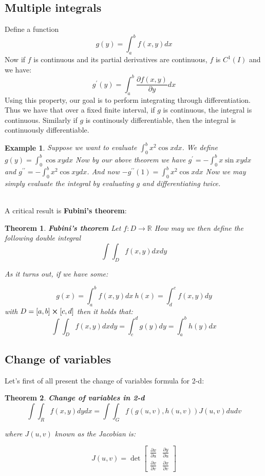 \documentclass[titlepage]{article}
\newtheorem{theorem}{Theorem}[section]
\newtheorem{example}{Example}[section]
\begin{document}
\subsection{Multiple integrals}

Define a function $$g(y) = \int_{a}^{b} f(x,y)dx$$ Now if $f$ is continuous and its partial derivatives are continuous, $f$ is $C^{1}(I)$ and we have:
$$g^{\prime}(y) = \int_{a}^{b} \frac{\partial f(x,y)}{\partial y}dx$$ Using this property, our goal is to perform integrating through differentiation. Thus we have that over a fixed finite interval, if $g$ is continuous, the integral is continuous. Similarly if $g$ is continously differentiable, then the integral is continuously differentiable. 

\begin{example}
Suppose we want to evaluate $\int_{0}^{b}x^{2}\cos{x}dx$. We define $g(y) = \int_{0}^{b}\cos{xy}dx$ Now by our above theorem we have $g^{\prime} = - \int_{0}^{b}x \sin{xy} dx$ and $g^{\prime\prime} = - \int_{0}^{b}x^{2} \cos{xy} dx$. And now $-g^{\prime\prime}(1) = \int_{0}^{b}x^{2} \cos{x} dx $ Now we may simply evaluate the integral by evaluating $g$ and differentiating twice. 
\end{example}
\\

A critical result is \textbf{Fubini's theorem}:

\begin{theorem}\textbf{Fubini's theorem}
Let $f:D \to \mathbb{R}$ How may we then define the following double integral $$\int{\int_{D}f(x,y) dxdy}$$

As it turns out, if we have some:

$$g(x) = \int_{a}^{b} f(x,y) dx \  h(x) = \int_{d}^{c} f(x,y) dy $$ 
with $D = [a,b] \cross [c,d]$ then it holds that:
$$\int{\int_{D}f(x,y) dxdy} = \int_{c}^{d} g(y)dy = \int_{a}^{b} h(y)dx$$

\end{theorem}

\subsection{Change of variables}
Let's first of all present the change of variables formula for 2-d:

\begin{theorem}\textbf{Change of variables in 2-d}
\\

$$ \int \int_{R} f(x,y)dydx = \int \int_{G} f(g(u,v),h(u,v)) J(u,v)dudv $$

where $J(u,v)$ known as the Jacobian is:

$$J(u,v) = \det{\begin{bmatrix}
 \frac{\partial x}{\partial u} & \frac{\partial y}{\partial u}\\
 \frac{\partial x}{\partial v} & \frac{\partial x}{\partial v}
\end{bmatrix}}$$

\end{theorem}
\end{document}
